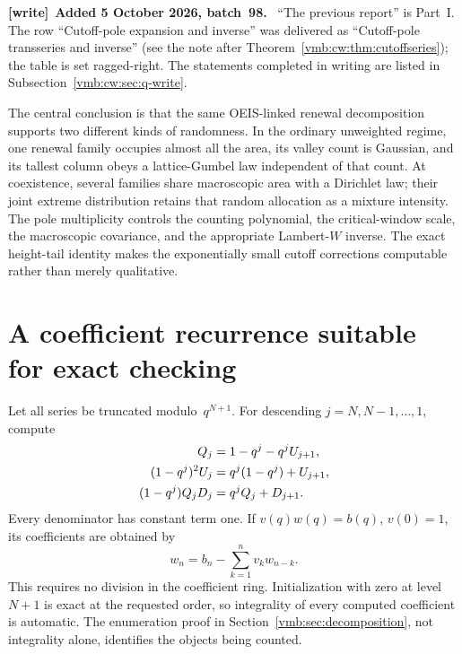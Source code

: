 \documentclass[11pt,a4paper]{article}
\numberwithin{equation}{section}
\theoremstyle{definition}\newtheorem{definition}[theorem]{Definition}
\theoremstyle{remark}\newtheorem{remark}[theorem]{Remark}
\newenvironment{writenote}[1][]{\par\smallskip\begingroup\small
 \noindent\textbf{[write]}\if\relax\detokenize{#1}\relax\else~\textbf{#1.}\fi\ }%
 {\par\endgroup\smallskip}
\begin{document}
\begin{writenote}[Added 5 October 2026, batch~98]
``The previous report'' is Part~I. The row ``Cutoff-pole expansion and
inverse'' was delivered as ``Cutoff-pole transseries and inverse''
(see the note after Theorem~\ref{vmb:cw:thm:cutoffseries}); the table is set
ragged-right. The statements
completed in writing are listed in Subsection~\ref{vmb:cw:sec:q-write}.
\end{writenote}

The central conclusion is that the same OEIS-linked renewal decomposition
supports two different kinds of randomness. In the ordinary unweighted
regime, one renewal family occupies almost all the area, its valley count is Gaussian,
and its tallest column obeys a lattice-Gumbel law independent of that count.
At coexistence, several families share macroscopic area with a Dirichlet
law; their joint extreme distribution retains that random allocation as a
mixture intensity. The pole multiplicity controls the counting polynomial,
the critical-window scale, the macroscopic covariance, and the appropriate
Lambert-$W$ inverse. The exact height-tail identity makes the exponentially
small cutoff corrections computable rather than merely qualitative.

\clearpage
{}
\appendix
\section{A coefficient recurrence suitable for exact checking}
Let all series be truncated modulo~\(q^{N+1}\). For descending
\(j=N,N-1,\ldots,1\), compute
\begin{align}
Q_j&=1-q^j-q^jU_{j+1},\notag\\
(1-q^j)^2U_j&=q^j(1-q^j)+U_{j+1},\label{vmb:eq:algorithm}\\
(1-q^j)Q_jD_j&=q^jQ_j+D_{j+1}.\notag
\end{align}
Every denominator has constant term one. If
\(v(q)w(q)=b(q)\), \(v(0)=1\), its coefficients are obtained by
\[
w_n=b_n-\sum_{k=1}^n v_k w_{n-k}.
\]
This requires no division in the coefficient ring. Initialization with
zero at level \(N+1\) is exact at the requested order, so integrality
of every computed coefficient is automatic. The enumeration proof in
Section~\ref{vmb:sec:decomposition}, not integrality alone, identifies the
objects being counted.
\end{document}
